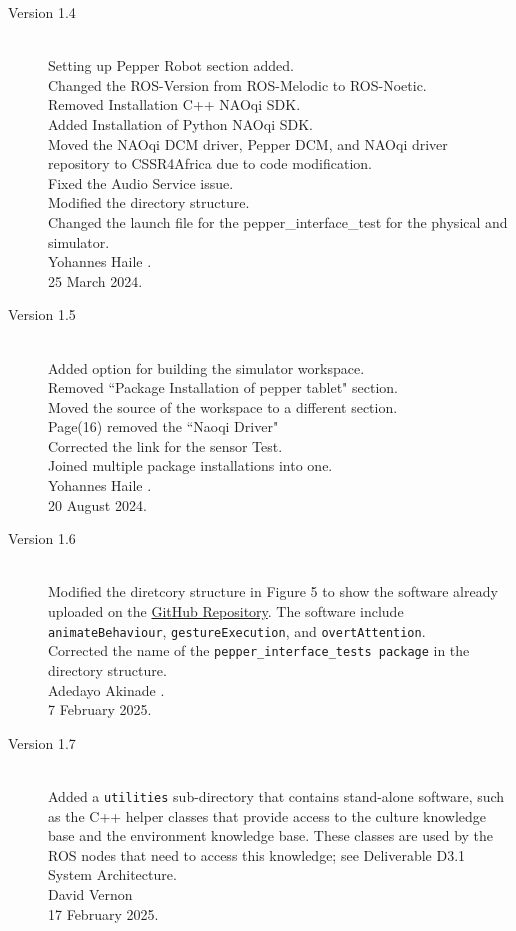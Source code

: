 \documentclass{CSSRforAfrica}
\begin{document}
{\begin{description}
\item [Version 1.4]~\\
Setting up Pepper Robot section added.\\
Changed the ROS-Version from ROS-Melodic to ROS-Noetic.\\
Removed Installation C++ NAOqi SDK.\\
Added Installation of Python NAOqi SDK.\\
Moved the NAOqi DCM driver, Pepper DCM, and NAOqi driver repository to CSSR4Africa due to code modification.\\
Fixed the Audio Service issue.\\
Modified the directory structure.\\
Changed the launch file for the pepper\_interface\_test for the physical and simulator.\\
Yohannes Haile .\\
25 March 2024.

\newpage

\item [Version 1.5]~\\
Added option for building the simulator workspace.\\
Removed ``Package Installation of pepper tablet" section.\\
Moved the source of the workspace to a different section.\\
Page(16) removed the ``Naoqi Driver" \\
Corrected the link for the sensor Test. \\
Joined multiple package installations into one.\\
Yohannes Haile .\\
20 August 2024.


\item [Version 1.6]~\\
Modified the diretcory structure in Figure 5 to show the software already uploaded on the \href{https://github.com/cssr4africa/cssr4africa} {GitHub Repository}.
The software include \texttt{animateBehaviour}, \texttt{gestureExecution}, and \texttt{overtAttention}.\\
Corrected the name of the \texttt{pepper\_interface\_tests package} in the directory structure.\\
Adedayo Akinade .\\
7 February 2025.

\item [Version 1.7]~\\
Added  a {\small \tt utilities} sub-directory that contains stand-alone software, such as the C++ helper classes that provide access to the culture knowledge base and the environment knowledge base. These classes are used by the ROS nodes that need to access this knowledge; see Deliverable D3.1 System Architecture.\\
David Vernon \\       
17 February 2025.


\end{description}}
\end{document}
